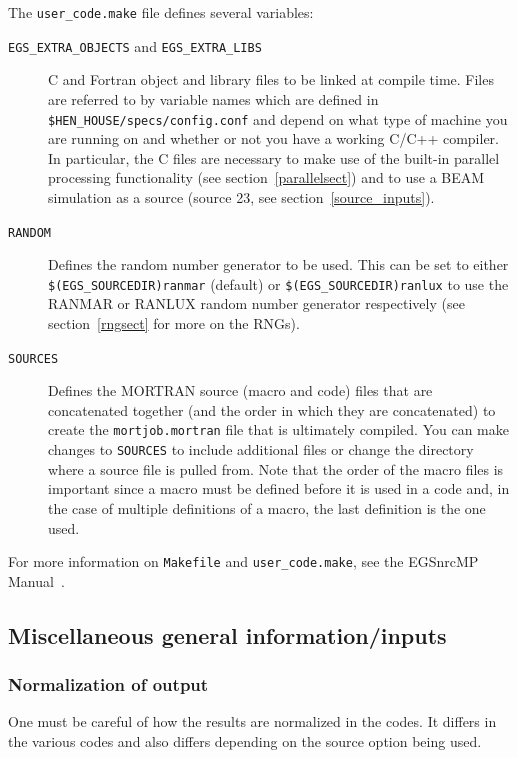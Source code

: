 \documentclass[12pt,twoside]{article}  %
\begin{document}
The {\tt user\_code.make} file defines several variables:
\begin{description}
\item [{\tt EGS\_EXTRA\_OBJECTS} and {\tt EGS\_EXTRA\_LIBS}] C and Fortran
object and library files to be linked at compile time.  Files are referred
to by variable names which are defined in {\tt \$HEN\_HOUSE/specs/config.conf}
and depend on what type of machine you are running on and whether or not you
have a working C/C++ compiler.  In particular, the C files are necessary
to make use of the built-in parallel processing functionality
(see section~\ref{parallelsect}) and to use a BEAM simulation
as a source (source 23, see section~\ref{source_inputs}).
\item [{\tt RANDOM}] Defines the random number generator to be used.  This 
can be set to either\\ {\tt \$(EGS\_SOURCEDIR)ranmar} (default) or
{\tt \$(EGS\_SOURCEDIR)ranlux} to use the RANMAR or RANLUX random number
generator respectively (see section~\ref{rngsect} for more on the RNGs).
\item [{\tt SOURCES}] Defines the MORTRAN source (macro and code) files that
are concatenated together (and the order in which they are concatenated)
to create the {\tt mortjob.mortran} file that is ultimately compiled.
You can make changes to {\tt SOURCES} to include additional files or 
change the directory where a source file is pulled from. 
Note that the order of the macro files is important since a macro
must be defined before it is used in a code and, in the case of multiple
definitions of a macro, the last definition is the one used.
\end{description}

For more information on {\tt Makefile} and {\tt user\_code.make}, see
the EGSnrcMP Manual~\cite{Ka03}.

\subsection{Miscellaneous general information/inputs}

\subsubsection{Normalization of output}
One must be careful of how the results are normalized in the codes. It
differs in the various codes and also differs depending on the source
option being used.
\end{document}
